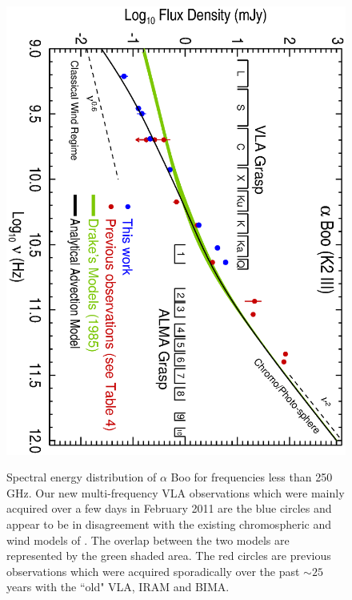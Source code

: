 \documentclass[iop]{emulateapj}
\begin{document}
\begin{figure}
\centering
\includegraphics[trim = 0mm 0mm 0mm 20mm, clip,scale=0.65, angle=90]{fig1.ps}
\\
\caption{Spectral energy distribution of $\alpha$ Boo for frequencies less than 250 GHz. Our new multi-frequency VLA observations which were mainly acquired over a few days in February 2011 are the blue circles and appear to be in disagreement with the existing chromospheric and wind models of \cite{1985pssl.proc..351D}. The overlap between the two models are represented by the green shaded area. The red circles are previous observations which were acquired sporadically over the past $\sim 25$ years with the ``old" VLA, IRAM and BIMA.}
\label{fig:fig1}
\centering

\end{figure}
\end{document}
